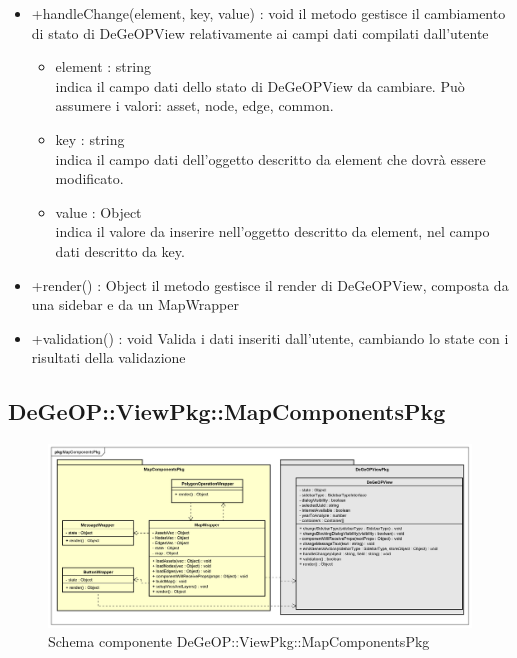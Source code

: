 \begin{itemize}
\begin{itemize}
		\item +handleChange(element, key, value) : void\newline
		il metodo gestisce il cambiamento di stato di DeGeOPView relativamente ai campi dati compilati dall'utente
		\begin{itemize}
			\item element : string\\
			indica il campo dati dello stato di DeGeOPView da cambiare. Può assumere i valori:
			asset, node, edge, common.
			\item key : string\\
			indica il campo dati dell'oggetto descritto da element che dovrà essere modificato.
			\item value : Object\\
			indica il valore da inserire nell'oggetto descritto da element, nel campo dati descritto da key.
		\end{itemize}
		\item +render() : Object\newline
		il metodo gestisce il render di DeGeOPView, composta da una sidebar e da un MapWrapper
		\item +validation() : void\newline
		Valida i dati inseriti dall'utente, cambiando lo state con i risultati della validazione
	\end{itemize}
\end{itemize}
\newpage
\subsection{DeGeOP::ViewPkg::MapComponentsPkg}
\label{pkg::MapComponentsPkg}
\begin{figure}[H]
	\centering
	\includegraphics[width=\textwidth]{img/PkgDiagram/MapComponentsPkg.png}
	\caption{Schema componente DeGeOP::ViewPkg::MapComponentsPkg}
\end{figure}
